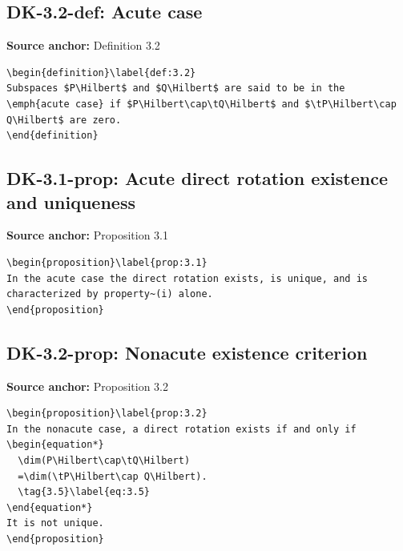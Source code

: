 \subsection*{DK-3.2-def: Acute case}
\noindent\textbf{Source anchor:} Definition 3.2\\
\begin{verbatim}
\begin{definition}\label{def:3.2}
Subspaces $P\Hilbert$ and $Q\Hilbert$ are said to be in the \emph{acute case} if $P\Hilbert\cap\tQ\Hilbert$ and $\tP\Hilbert\cap Q\Hilbert$ are zero.
\end{definition}
\end{verbatim}

\subsection*{DK-3.1-prop: Acute direct rotation existence and uniqueness}
\noindent\textbf{Source anchor:} Proposition 3.1\\
\begin{verbatim}
\begin{proposition}\label{prop:3.1}
In the acute case the direct rotation exists, is unique, and is characterized by property~(i) alone.
\end{proposition}
\end{verbatim}

\subsection*{DK-3.2-prop: Nonacute existence criterion}
\noindent\textbf{Source anchor:} Proposition 3.2\\
\begin{verbatim}
\begin{proposition}\label{prop:3.2}
In the nonacute case, a direct rotation exists if and only if
\begin{equation*}
  \dim(P\Hilbert\cap\tQ\Hilbert)
  =\dim(\tP\Hilbert\cap Q\Hilbert).
  \tag{3.5}\label{eq:3.5}
\end{equation*}
It is not unique.
\end{proposition}
\end{verbatim}

